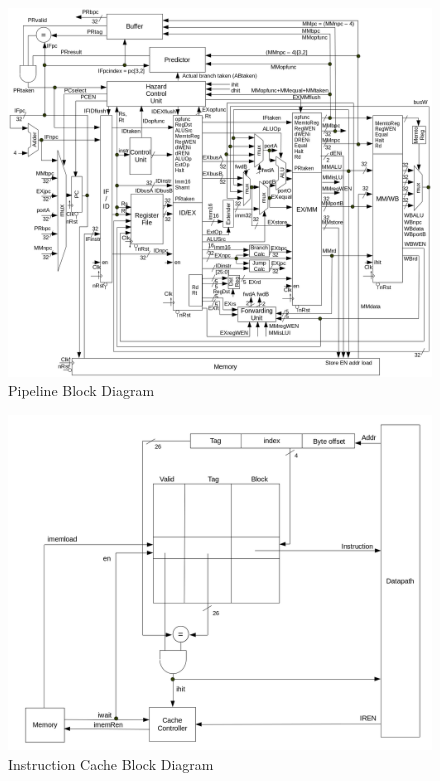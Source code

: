 \documentclass[12pt]{article}
\begin{document}
  \begin{figure}[hp]
    \begin{center}
      \includegraphics[width=\textwidth]{diagrams/diagram_pipeline.png}
    \end{center}

    \caption{Pipeline Block Diagram}
		\label{fig:pipeline}
  \end{figure}

  \newpage
  \begin{figure}[hp]
    \begin{center}
      \includegraphics[width=\textwidth]{diagrams/diagram_icache.png}
    \end{center}

    \caption{Instruction Cache Block Diagram}
		\label{fig:icache}
  \end{figure}
\end{document}

